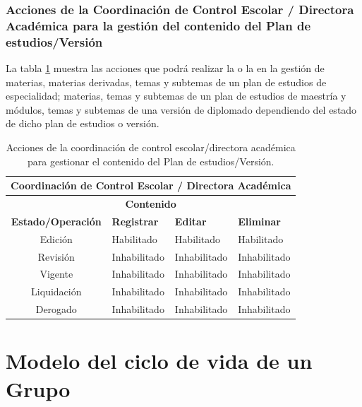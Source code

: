 \subsubsection{Acciones de la Coordinación de Control Escolar / Directora Académica para la gestión del contenido del Plan de estudios/Versión}
La tabla \ref{tb:habilitarAccionesEditarCCE}  muestra las acciones que podrá realizar la  o la  en la gestión de materias, materias derivadas, temas y subtemas de un plan de estudios de especialidad; materias, temas y subtemas de un plan de estudios de maestría y módulos, temas y subtemas de una versión de diplomado dependiendo del estado de dicho plan de estudios o versión.
\begin{table}[htpb!]
	\centering
	\begin{tabular}{|c|l|l|l|}
		\hline
		\multicolumn{4}{|c|}{\textbf{Coordinación de Control Escolar / Directora Académica}}\\
		\hline
		\multicolumn{4}{|c|}{\textbf{Contenido}}
		\\ \hline \hline
		\textbf{Estado/Operación} & \textbf{Registrar} & \textbf{Editar} & \textbf{Eliminar} \\ \hline \hline
		Edición & Habilitado & Habilitado & Habilitado \\ \hline
		Revisión & Inhabilitado & Inhabilitado & Inhabilitado \\ \hline
		Vigente & Inhabilitado & Inhabilitado & Inhabilitado \\ \hline
		Liquidación & Inhabilitado & Inhabilitado & Inhabilitado \\ \hline
		Derogado & Inhabilitado & Inhabilitado & Inhabilitado \\ \hline
	\end{tabular}
	\caption{Acciones de la coordinación de control escolar/directora académica para gestionar el contenido del Plan de estudios/Versión.}
	\hypertarget{tb:habilitarAccionesEditarCCE}{}
	\label{tb:habilitarAccionesEditarCCE}
\end{table}




\hypertarget{cv:Grupo}{\section{Modelo del ciclo de vida de un Grupo} }

